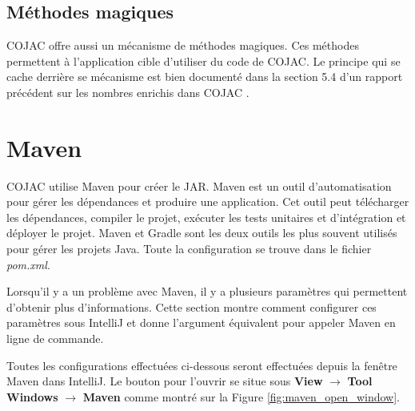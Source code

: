 \subsection{Méthodes magiques}

\Gls{COJAC} offre aussi un mécanisme de méthodes magiques. Ces méthodes permettent à l'application cible d'utiliser du code de \gls{COJAC}. Le principe qui se cache derrière se mécanisme est bien documenté dans la section 5.4 d'un rapport précédent sur les nombres enrichis dans COJAC \cite{enriched-numbers}.

\section{Maven}

\gls{COJAC} utilise \gls{Maven} \cite{maven} pour créer le \gls{JAR}. \gls{Maven} est un outil d'automatisation pour gérer les dépendances et produire une application. Cet outil peut télécharger les dépendances, compiler le projet, exécuter les tests unitaires et d'intégration et déployer le projet. \gls{Maven} et Gradle sont les deux outils les plus souvent utilisés pour gérer les projets Java. Toute la configuration se trouve dans le fichier \textit{pom.xml}.

\subtitle{Debug}
\label{sec:cojac_maven_debug}

Lorsqu'il y a un problème avec \gls{Maven}, il y a plusieurs paramètres qui permettent d'obtenir plus d'informations. Cette section montre comment configurer ces paramètres sous IntelliJ et donne l'argument équivalent pour appeler \gls{Maven} en ligne de commande.

\begin{minipage2}
\subtitle{Ouvrir la fenêtre Maven}

Toutes les configurations effectuées ci-dessous seront effectuées depuis la fenêtre \gls{Maven} dans IntelliJ. Le bouton pour l'ouvrir se situe sous \textbf{View} $\rightarrow$ \textbf{Tool Windows} $\rightarrow$ \textbf{Maven} comme montré sur la Figure \ref{fig:maven_open_window}.
\end{minipage2}

\begin{minipage}{\linewidth}%
\label{fig:maven_open_window}
\end{minipage}

